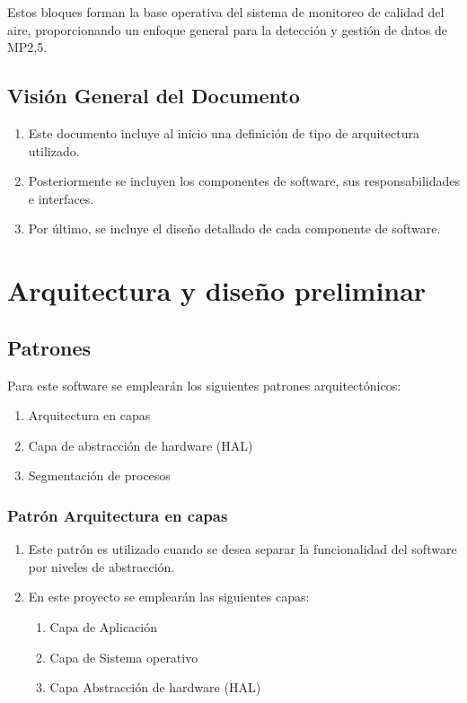 \documentclass[
11pt, %
codirector, %
]{charter}
\begin{document}
Estos bloques forman la base operativa del sistema de monitoreo de calidad del aire, proporcionando un enfoque general para la detección y gestión de datos de MP2,5.

\subsection{Visión General del Documento}
\begin{enumerate}
	\item Este documento incluye al inicio una definición de tipo de arquitectura utilizado.
	\item Posteriormente se incluyen los componentes de software, sus responsabilidades e interfaces.
	\item Por último, se incluye el diseño detallado de cada componente de software.
\end{enumerate}

	
\section{Arquitectura y diseño preliminar}	
\label{sec:orgaf51da6}
\subsection{Patrones}

 Para este software se emplearán los siguientes patrones arquitectónicos:
 
 \begin{enumerate}
 	\item Arquitectura en capas
 	\item Capa de abstracción de hardware (HAL)
 	\item Segmentación de procesos
 \end{enumerate}

\subsubsection{Patrón Arquitectura en capas}
\begin{enumerate}
	\item Este patrón es utilizado cuando se desea separar la funcionalidad del software por niveles de abstracción.
	\item En este proyecto se emplearán las siguientes capas:
	\begin{enumerate}
		\item Capa de Aplicación
		\item Capa de Sistema operativo
		\item Capa Abstracción de hardware (HAL)
	\end{enumerate}
\end{enumerate}
\end{document}
